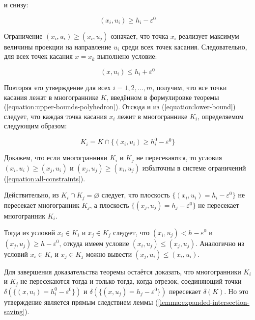\documentclass[a4paper, 10pt]{article}
\theoremstyle{definition}
\theoremstyle{plain}
\theoremstyle{plain}
\begin{document}
и снизу:

\begin{equation}
\label{equation:lower-bound}
 (x_{i}, u_{i}) \geq h_{i} - \varepsilon^{0}
\end{equation}

Ограничение $(x_{i}, u_{i}) \geq (x_{i}, u_{j})$ означает, что точка $x_{i}$
реализует максимум величины проекции на направление $u_{i}$ среди всех точек
касания. Следовательно, для всех точек касания $x = x_{k}$ выполнено условие:

\begin{equation}
 (x, u_{i}) \leq h_{i} + \varepsilon^{0}
\end{equation}

Повторяя это утверждение для всех $i = 1, 2, \ldots, m$, получим, что все точки
касания лежат в многограннике $K$, введённом в формулировке теоремы
(\ref{equation:upper-bounds-polyhedron}). Отсюда и из
(\ref{equation:lower-bound}) следует, что каждая точка касания $x_{i}$ лежит
в многограннике $K_{i}$, определяемом следующим образом:

\begin{equation}
 K_{i} = K \cap \{(x_{i}, u_{i}) \geq h^{0}_{i} - \varepsilon^{0}\}
\end{equation}

Докажем, что если многогранники $K_{i}$ и $K_{j}$ не пересекаются, то условия
$(x_{i}, u_{i}) \geq (x_{j}, u_{i})$ и $(x_{j}, u_{j}) \geq (x_{i}, u_{j})$
избыточны в системе ограничений (\ref{equation:all-constraints}).

Действительно, из $K_{i} \cap K_{j} = \varnothing$ следует, что плоскость
$\{(x_{i}, u_{i}) = h_{i} - \varepsilon^{0}\}$ не пересекает многогранник
$K_{j}$, а плоскость $\{(x_{j}, u_{j}) = h_{j} - \varepsilon^{0}\}$ не
пересекает многогранник $K_{i}$.

Тогда из условий $x_{i} \in K_{i}$ и $x_{j} \in K_{j}$ следует, что
$(x_{i}, u_{j}) < h - \varepsilon^{0}$ и
$(x_{j}, u_{j}) \geq h - \varepsilon^{0}$, откуда имеем условие
$(x_{i}, u_{j}) \leq (x_{j}, u_{j})$. Аналогично из условий $x_{i} \in K_{i}$ и
$x_{j} \in K_{j}$ можно вывести $(x_{j}, u_{i}) \leq (x_{i}, u_{i})$.

Для завершения доказательства теоремы остаётся доказать, что многогранники
$K_{i}$ и $K_{j}$ не пересекаются тогда и только тогда, когда отрезок,
соединяющий точки $\delta(\{(x, u_{i}) = h^{0}_{i} - \varepsilon^{0}\})$ и
$\delta(\{(x, u_{j}) = h_{j} - \varepsilon^{0}\})$ пересекает $\delta(K)$.
Но это утверждение является прямым следствием леммы
(\ref{lemma:expanded-intersection-saving}).
\end{document}
